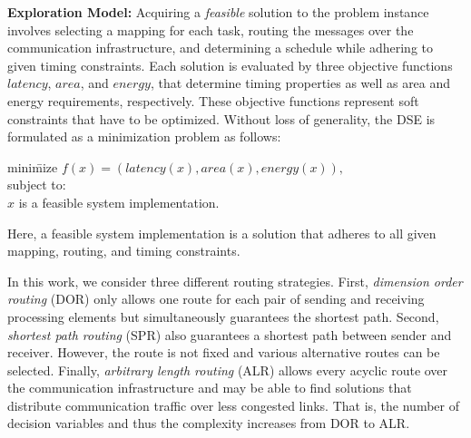\textbf{Exploration Model: }
Acquiring a \emph{feasible} solution to the problem instance involves selecting a mapping for each task, routing the messages over the communication infrastructure, and determining a schedule while adhering to given timing constraints. Each solution is evaluated by three objective functions $latency$, $area$, and $energy$, that determine timing properties as well as area and energy requirements, respectively. These objective functions represent soft constraints that have to be optimized. Without loss of generality, the \ac{DSE} is formulated as a minimization problem as follows:
\begin{center}
	\vspace*{-0.1cm}
	\begin{minipage}[c]{0.2\textwidth}
		\begin{tabbing}
			mini\=mize $f(x) = (latency(x), area(x), energy(x)),$ \\
			subject to: \\
			\> $x$ is a feasible system implementation.
		\end{tabbing}
	\end{minipage}
	\vspace*{-0.1cm}
\end{center}
Here, a feasible system implementation is a solution that adheres to all given mapping, routing, and timing constraints. \par
In this work, we consider three different routing strategies. First, \emph{dimension order routing} (DOR) only allows one route for 
each pair of sending and receiving processing elements but simultaneously guarantees the shortest path. Second, \emph{shortest path 
routing} (SPR) also guarantees a shortest path between sender and receiver. However, the route is not fixed and various alternative 
routes can be selected. Finally, \emph{arbitrary length routing} (ALR) allows every acyclic route over the communication 
infrastructure and may be able to find solutions that distribute communication traffic over less congested links. That is, the 
number of decision variables and thus the complexity increases from DOR to ALR. 
